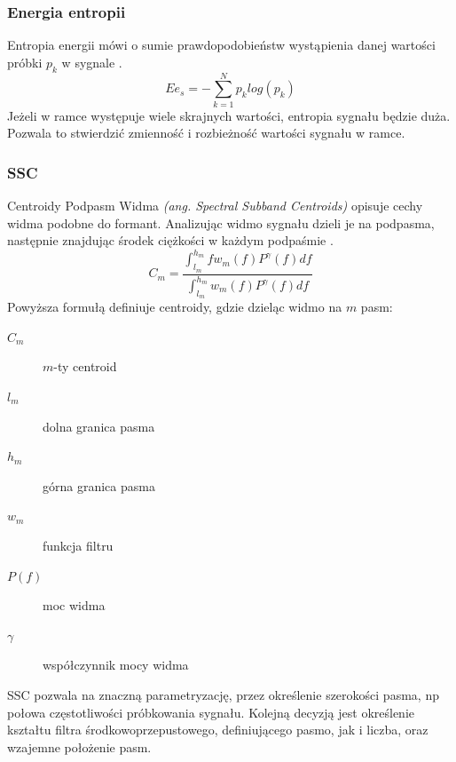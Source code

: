 \documentclass[a4paper,12pt,twoside,openany]{report}
\newcommand{\ang}[1]{\textit{(ang. #1)}}
\begin{document}
\subsubsection{Energia entropii}
Entropia energii mówi o sumie prawdopodobieństw wystąpienia danej wartości próbki $p_k$ w sygnale \cite{Majstorovic2011}.
\begin{equation}
	Ee_{s}=-\sum _{k=1}^{N}p_k log(p_k)
	\label{eq:entropy_energy}
\end{equation}
Jeżeli w ramce występuje wiele skrajnych wartości, entropia sygnału będzie duża. 
Pozwala to stwierdzić zmienność i rozbieżność wartości sygnału w ramce.
\subsubsection{SSC}
Centroidy Podpasm Widma \ang{Spectral Subband Centroids} opisuje cechy widma podobne do formant.
Analizując widmo sygnału dzieli je na podpasma, następnie znajdując środek ciężkości w każdym podpaśmie \cite{Majstorovic2011}.
\begin{equation}
	C_m=\frac
	{\int_{l_m}^{h_m} f w_m(f) P^\gamma(f)df}
	{\int_{l_m}^{h_m} w_m(f) P^\gamma(f)df}
	\label{eq:ssc}
\end{equation}
Powyższa formułą definiuje centroidy, gdzie dzieląc widmo na $m$ pasm:
\begin{description}
	\item[$C_m$] $m$-ty centroid
	\item[$l_m$] dolna granica pasma
	\item[$h_m$] górna granica pasma
	\item[$w_m$] funkcja filtru
	\item[$P(f)$] moc widma
	\item[$\gamma$] współczynnik mocy widma
\end{description}
SSC pozwala na znaczną parametryzację, przez określenie szerokości pasma, np połowa częstotliwości próbkowania sygnału.
Kolejną decyzją jest określenie kształtu filtra środkowoprzepustowego, definiującego pasmo, 
jak i liczba, oraz wzajemne położenie pasm.
\end{document}
